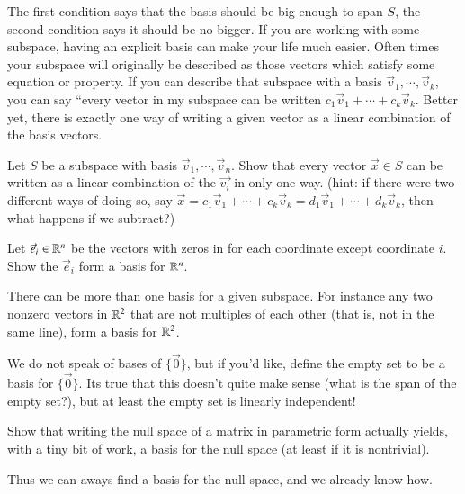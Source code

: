 The first condition says that the basis should be big enough to span $S$, the second condition says it should be no bigger.  
If you are working with some subspace, having an explicit basis can make your life much easier.
Often times your subspace will originally be described as those vectors which satisfy some equation or property.
If you can describe that subspace with a basis $\vec{v}_1,\cdots,\vec{v}_k$, you can say ``every vector in my subspace can be written $c_1\vec{v}_1+\cdots+c_k\vec{v}_k$.
Better yet, there is exactly one way of writing a given vector as a linear combination of the basis vectors.
\begin{ImpEx}
  Let $S$ be a subspace with basis $\vec{v}_1,\cdots,\vec{v}_n$.  Show that every vector $\vec{x}\in S$ can be written as a linear combination of the $\vec{v_i}$ in only one way.  (hint: if there were two different ways of doing so, say $\vec{x} = c_1\vec{v}_1+\cdots+c_k\vec{v}_k = d_1\vec{v}_1+\cdots+d_k\vec{v}_k$, then what happens if we subtract?)
\end{ImpEx}
\begin{EasyEx}
  \label{sec:standardbasis}
  Let $\vec{e}_i\in \mathbb{R}^n$ be the vectors with zeros in for each coordinate except coordinate $i$.
  Show the $\vec{e}_i$ form a basis for $\mathbb{R}^n$.  
\end{EasyEx}
\begin{Warning}
  There can be more than one basis for a given subspace.
  For instance any two nonzero vectors in $\mathbb{R}^2$ that are not multiples of each other (that is, not in the same line), form a basis for $\mathbb{R}^2$.  
\end{Warning}
\begin{UnimportantRemark}
  We do not speak of bases of $\{\vec{0}\}$, but if you'd like, define the empty set to be a basis for $\{\vec{0}\}$.
  Its true that this doesn't quite make sense (what is the span of the empty set?), but at least the empty set is linearly independent!
\end{UnimportantRemark}
\begin{Ex}
  Show that writing the null space of a matrix in parametric form actually yields, with a tiny bit of work, a basis for the null space (at least if it is nontrivial).  
\end{Ex}
Thus we can aways find a basis for the null space, and we already know how.  


